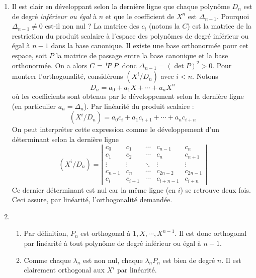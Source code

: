 \begin{enumerate}
\begin{enumerate}
 \end{enumerate}
\item Il est clair en développant selon la dernière ligne que chaque polynôme $D_n$ est de degré \emph{inférieur ou égal} à $n$ et que le coefficient de $X^n$ est $\Delta_{n-1}$.\newline
Pourquoi $\Delta_{n-1} \neq 0$ est-il non nul ?\newline
La matrice des $c_i$ (notons la $C$) est la matrice de la restriction du produit scalaire à l'espace des polynômes de degré inférieur ou égal à $n-1$ dans la base canonique. Il existe une base orthonormée pour cet espace, soit $P$ la matrice de passage entre la base canonique et la base orthonormée. On a alors $C=\,\mathstrut^t\! P\,P$ donc $\Delta_{n-1}=(\det P)^2>0$.\newline
Pour montrer l'orthogonalité, considérons $(X^i/D_n)$ avec $i<n$. Notons
\begin{displaymath}
 D_n= a_0+a_1X + \cdots +a_n X^n
\end{displaymath}
où les coefficients sont obtenus par le développement selon la dernière ligne (en particulier $a_n=\Delta_n$). Par linéarité du produit scalaire :
\begin{displaymath}
 (X^i/D_n) = a_0c_i+a_1c_{i+1}+\cdots + a_nc_{i+n}
\end{displaymath}
On peut interpréter cette expression comme le développement d'un déterminant selon la dernière ligne
\begin{displaymath}
 (X^i/D_n) = \left \vert
\begin{array}{ccccc}
 c_0 & c_1 & \cdots & c_{n-1} & c_n \\
 c_1 & c_2 & \cdots & c_{n} & c_{n+1} \\
 \vdots & \vdots & \ddots & \vdots & \vdots \\
 c_{n-1} & c_n & \cdots & c_{2n-2} & c_{2n-1} \\
c_i & c_{i+1} & \cdots & c_{i+n-1} & c_{i+n}
\end{array}
\right \vert
\end{displaymath}
Ce dernier déterminant est nul car la même ligne (en $i$) se retrouve deux fois. Ceci assure, par linéarité, l'orthogonalité demandée.
\item
\begin{enumerate}
 \item Par définition, $P_n$ est orthogonal à $1,X,\cdots,X^{n-1}$. Il est donc orthogonal par linéarité à tout polynôme de degré inférieur ou égal à $n-1$. 
 \item Comme chaque $\lambda_n$ est non nul, chaque $\lambda_nP_n$ est bien de degré $n$. Il est clairement orthogonal aux $X^i$ par linéarité.

\end{enumerate}
\end{enumerate}
